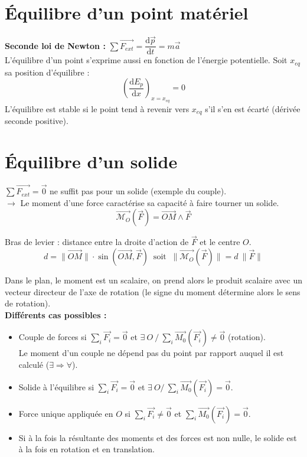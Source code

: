 \documentclass[13pt, twoside, a4paper, french]{report}
\begin{document}
  
  \section{Équilibre d'un point matériel}\label{sec:equilibre-d'un-point-materiel}
    
    \textbf{Seconde loi de Newton : } $\sum \overrightarrow{F_{ext}} = \dfrac{\textrm{d}\vec{p}}{\textrm{d}t} = m \vec{a}$\\
    L'équilibre d'un point s'exprime aussi en fonction de l'énergie potentielle.
    Soit $x_{eq}$ sa position d'équilibre :
    \[ \left( \dfrac{\textrm{d}E_p}{\textrm{d}x}\right) _{x=x_{eq}} = 0\]
    L'équilibre est stable si le point tend à revenir vers $x_{eq}$ s'il s'en est écarté (dérivée seconde positive).
  
  
  \section{Équilibre d'un solide}\label{sec:equilibre-d-un-solide}
    
    $\sum \overrightarrow{F_{ext}} = \vec{0}$ ne suffit pas pour un solide (exemple du couple).\\
    $\rightarrow$ Le moment d'une force caractérise sa capacité à faire tourner un solide.
    \[ \overrightarrow{\mathcal{M}_O}(\overrightarrow{F}) = \overrightarrow{OM} \land \overrightarrow{F} \]
    
    Bras de levier : distance entre la droite d'action de $\overrightarrow{F}$ et le centre $O$.
    \[ d = \|\overrightarrow{OM}\| \cdot \sin(\overrightarrow{OM}, \overrightarrow{F}) \;\; \text{soit} \;\; \|\overrightarrow{\mathcal{M}_O}(\overrightarrow{F})\| = d\ \|\overrightarrow{F}\| \]
    
    Dans le plan, le moment est un scalaire, on prend alors le produit scalaire avec un vecteur directeur de l'axe de rotation (le signe du moment détermine alors le sens de rotation).\\
    
    \textbf{Différents cas possibles :}
    \begin{itemize}
      \item Couple de forces si $\sum_i \overrightarrow{F_i} = \vec 0$ et $\exists\ O\ /\ \sum_i \overrightarrow{M_0}(\overrightarrow{F_i}) \neq \vec 0$ (rotation).\\Le moment d’un couple ne dépend pas du point par rapport auquel il est calculé ($\exists \Rightarrow \forall$).
      \item Solide à l'équilibre si $\sum_i \overrightarrow{F_i} = \vec 0$ et $\exists\ O /\ \sum_i \overrightarrow{M_0}(\overrightarrow{F_i}) = \vec 0$.
      \item Force unique appliquée en $O$ si $\sum_i \overrightarrow{F_i} \neq \vec 0$ et $\sum_i \overrightarrow{M_0}(\overrightarrow{F_i}) = \vec 0$.
      \item Si à la fois la résultante des moments et des forces est non nulle, le solide est à la fois en rotation et en translation.
    \end{itemize}
\end{document}
